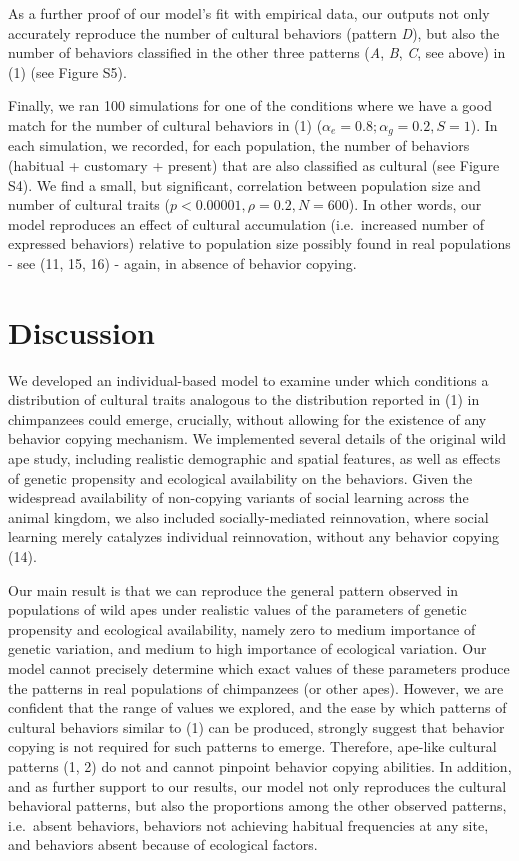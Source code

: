 \documentclass[9pt,twocolumn,twoside,]{pnas-new}
\begin{document}
As a further proof of our model's fit with empirical data, our outputs
not only accurately reproduce the number of cultural behaviors (pattern
\emph{D}), but also the number of behaviors classified in the other
three patterns (\emph{A}, \emph{B}, \emph{C}, see above) in (1) (see
Figure S5).

Finally, we ran 100 simulations for one of the conditions where we have
a good match for the number of cultural behaviors in (1)
(\(\alpha_e=0.8;\alpha_g=0.2, S=1\)). In each simulation, we recorded,
for each population, the number of behaviors (habitual + customary +
present) that are also classified as cultural (see Figure S4). We find a
small, but significant, correlation between population size and number
of cultural traits (\(p<0.00001,\rho=0.2,N=600\)). In other words, our
model reproduces an effect of cultural accumulation (i.e.~increased
number of expressed behaviors) relative to population size possibly
found in real populations - see (11, 15, 16) - again, in absence of
behavior copying.

\section*{Discussion}\label{discussion}

We developed an individual-based model to examine under which conditions
a distribution of cultural traits analogous to the distribution reported
in (1) in chimpanzees could emerge, crucially, without allowing for the
existence of any behavior copying mechanism. We implemented several
details of the original wild ape study, including realistic demographic
and spatial features, as well as effects of genetic propensity and
ecological availability on the behaviors. Given the widespread
availability of non-copying variants of social learning across the
animal kingdom, we also included socially-mediated reinnovation, where
social learning merely catalyzes individual reinnovation, without any
behavior copying (14).

Our main result is that we can reproduce the general pattern observed in
populations of wild apes under realistic values of the parameters of
genetic propensity and ecological availability, namely zero to medium
importance of genetic variation, and medium to high importance of
ecological variation. Our model cannot precisely determine which exact
values of these parameters produce the patterns in real populations of
chimpanzees (or other apes). However, we are confident that the range of
values we explored, and the ease by which patterns of cultural behaviors
similar to (1) can be produced, strongly suggest that behavior copying
is not required for such patterns to emerge. Therefore, ape-like
cultural patterns (1, 2) do not and cannot pinpoint behavior copying
abilities. In addition, and as further support to our results, our model
not only reproduces the cultural behavioral patterns, but also the
proportions among the other observed patterns, i.e.~absent behaviors,
behaviors not achieving habitual frequencies at any site, and behaviors
absent because of ecological factors.
\end{document}
